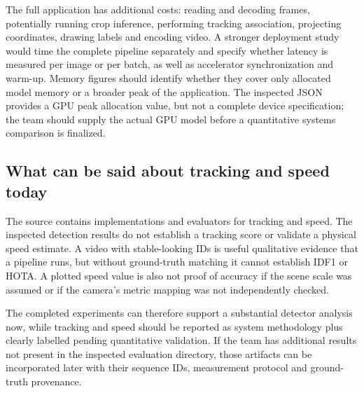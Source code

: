 The full application has additional costs: reading and decoding frames, potentially running crop inference, performing tracking association, projecting coordinates, drawing labels and encoding video. A stronger deployment study would time the complete pipeline separately and specify whether latency is measured per image or per batch, as well as accelerator synchronization and warm-up. Memory figures should identify whether they cover only allocated model memory or a broader peak of the application. The inspected JSON provides a GPU peak allocation value, but not a complete device specification; the team should supply the actual GPU model before a quantitative systems comparison is finalized.

\subsection{What can be said about tracking and speed today}
The source contains implementations and evaluators for tracking and speed. The inspected detection results do not establish a tracking score or validate a physical speed estimate. A video with stable-looking IDs is useful qualitative evidence that a pipeline runs, but without ground-truth matching it cannot establish IDF1 or HOTA. A plotted speed value is also not proof of accuracy if the scene scale was assumed or if the camera's metric mapping was not independently checked.

The completed experiments can therefore support a substantial detector analysis now, while tracking and speed should be reported as system methodology plus clearly labelled pending quantitative validation. If the team has additional results not present in the inspected evaluation directory, those artifacts can be incorporated later with their sequence IDs, measurement protocol and ground-truth provenance.
